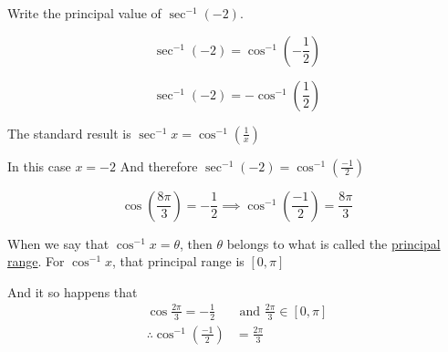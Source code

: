 \documentclass[14pt,fleqn]{extarticle}
\begin{document}
Write the principal value of $\sec^{-1}(-2)$. 
%
%
\newcard 

\[ \sec^{-1} (-2) = \cos^{-1} \left(-\frac{1}{2} \right)\]

\newcard 

\[ \sec^{-1} (-2) = -\cos^{-1} \left(\frac{1}{2} \right)\]

\newcard 

The standard result is $\sec^{-1} x = \cos^{-1} \left(\frac{1}{x} \right)$ \newline 

In this case $x = -2$\newline 
And therefore $\sec^{-1} (-2) = \cos^{-1} \left(\frac{-1}{2} \right)$ \newline 

\newcard 

\[ \cos \left(\frac{8\pi}{3} \right) = -\frac{1}{2} \implies\cos^{-1} \left( \frac{-1}{2}\right) = \frac{8\pi}{3}\]

\newcard 

When we say that $\cos^{-1}x = \theta$, then $\theta$ belongs to what is called the \underline{principal range}. For $\cos^{-1}x$, that principal range is $[0,\pi]$\newline 

And it so happens that 
\begin{align}
\cos \frac{2\pi}{3} = -\frac{1}{2} &\text{ and } \frac{2\pi}{3}\in [0,\pi] \\
\therefore \cos^{-1} \left(\frac{-1}{2} \right) &= \frac{2\pi}{3}
\end{align}
\end{document}
